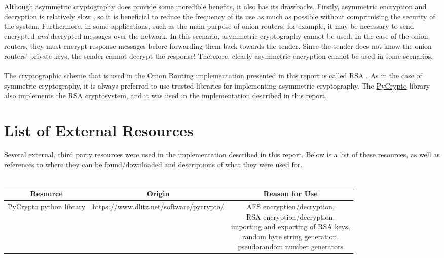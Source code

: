 \documentclass[10pt]{report}
\begin{document}
\begin{appendix}
	Although asymmetric cryptography does provide some incredible benefits, it also has its
	drawbacks. Firstly, asymmetric encryption and decryption is relatively slow
	\cite{SymmetricVsAsymmetric}, so it is beneficial to reduce the frequency of its use as much as
	possible without comprimising the security of the system. Furthermore, in some applications,
	such as the main purpose of onion routers, for example, it may be necessary to send encrypted
	\textit{and} decrypted messages over the network. In this scenario, asymmetric cryptography
	cannot be used. In the case of the onion routers, they must encrypt response messages before
	forwarding them back towards the sender. Since the sender does not know the onion routers'
	private keys, the sender cannot decrypt the response! Therefore, clearly asymmetric encryption
	cannot be used in some scenarios.\\\\
	The cryptographic scheme that is used in the Onion Routing implementation presented in this
	report is called RSA \cite{RSA}. As in the case of symmetric cryptography, it is always
	preferred to use trusted libraries for implementing asymmetric cryptography. The
	\href{https://www.dlitz.net/software/pycrypto/}{PyCrypto} library also implements the RSA
	cryptosystem, and it was used in the implementation described in this report.
	\chapter{List of External Resources}
	Several external, third party resources were used in the implementation described in this
	report. Below is a list of these resources, as well as references to where they can be
	found/downloaded and descriptions of what they were used for.\\\\
	\begin{tabular}{|c|c|c|}
		\hline
		\textbf{Resource} & \textbf{Origin} & \textbf{Reason for Use}\\\hline
		PyCrypto python library & \url{https://www.dlitz.net/software/pycrypto/} & \makecell{AES
		encryption/decryption,\\RSA encryption/decryption,\\importing and exporting of RSA keys,\\random
		byte string generation,\\pseudorandom number generators}\\\hline
	\end{tabular}
\end{appendix}


\end{document}
